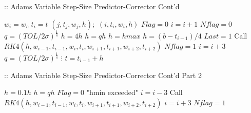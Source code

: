 \documentclass[12pt,oneside]{book}
\begin{document}
\begin{spacing}{1.2}
				\begin{algorithm}[H]
					\caption{:: Adams Variable Step-Size Predictor-Corrector Cont'd}
					\setcounter{algorithm}{19}
					\begin{algorithmic}[1]
						\STATE $ w_{i} = w_{c} $ \hspace*{0.5cm} 
						\STATE $ t_{i} = t $
						\RETURN $ (j, t_{j}, w_{j}, h); $ \hspace*{0.5cm} 
						\ENDFOR
						\ELSE
						\RETURN $ (i, t_{i}, w_{i}, h) $ \hspace*{0.5cm} 
						\ENDIF						
						\STATE $ Flag = 0 $
						\ELSE %
						\STATE $ i = i + 1 $
						\STATE $ Nflag = 0 $
						\STATE $ q = (TOL / 2\sigma)^{\frac{1}{4}} $
						\STATE $ h = 4h $
						\ELSE
						\STATE $ h = qh $
						\ENDIF
						\STATE $ h = hmax $
						\ENDIF
						\STATE $ h = (b - t_{i-1}) / 4 $
						\STATE $ Last = 1 $
						\ENDIF
						\STATE Call $ RK4(h, w_{i-1}, t_{i-1}, w_{i}, t_{i}, w_{i+1}, t_{i+1}, w_{i+2}, t_{i+2}) $
						\STATE $ Nflag = 1 $
						\STATE $ i = i + 3 $ \hspace*{0.5cm} 
						\ENDIF
						\ENDIF
						\ELSE
						\STATE $ q = (TOL / 2\sigma)^{\frac{1}{4}} $ \hspace*{0.5cm} 
						\STATE $ \vdots $ 
						\ENDIF
						\STATE $ t = t_{i-1} + h $
					\end{algorithmic}
				\end{algorithm}
			
				\begin{algorithm}[H]
					\caption{:: Adams Variable Step-Size Predictor-Corrector Cont'd Part 2}
					\setcounter{algorithm}{19}
					\begin{algorithmic}[1]
						\STATE $ h = 0.1h $
						\ELSE
						\STATE $ h = qh $
						\ENDIF
						\STATE $ Flag = 0 $
						\PRINT "hmin exceeded"
						\ELSE
						\STATE $ i = i - 3 $ \hspace*{0.5cm} 
						\STATE Call $ RK4(h, w_{i-1}, t_{i-1}, w_{i}, t_{i}, w_{i+1}, t_{i+1}, w_{i+2}, t_{i+2}) $
						\STATE $ i = i + 3 $
						\STATE $ Nflag = 1 $
						\ENDIF
						\ENDIF
					\end{algorithmic}
				\end{algorithm}
			
		\end{spacing}
		
\end{document}
